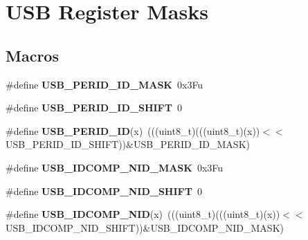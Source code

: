 \hypertarget{group___u_s_b___register___masks}{}\section{U\+SB Register Masks}
\label{group___u_s_b___register___masks}
\subsection*{Macros}
\begin{DoxyCompactItemize}
\item 
\mbox{\label{group___u_s_b___register___masks_ga7c4ef4c7ba738b9ec7ee90c6c482c1e5}} 
\#define {\bfseries U\+S\+B\+\_\+\+P\+E\+R\+I\+D\+\_\+\+I\+D\+\_\+\+M\+A\+SK}~0x3\+Fu
\item 
\mbox{\label{group___u_s_b___register___masks_ga15b2af97cadcb108b2489e2d29e8957e}} 
\#define {\bfseries U\+S\+B\+\_\+\+P\+E\+R\+I\+D\+\_\+\+I\+D\+\_\+\+S\+H\+I\+FT}~0
\item 
\mbox{\label{group___u_s_b___register___masks_gad306299b648ed1827f0b4a6ad1c81c1d}} 
\#define {\bfseries U\+S\+B\+\_\+\+P\+E\+R\+I\+D\+\_\+\+ID}(x)~(((uint8\+\_\+t)(((uint8\+\_\+t)(x))$<$$<$U\+S\+B\+\_\+\+P\+E\+R\+I\+D\+\_\+\+I\+D\+\_\+\+S\+H\+I\+FT))\&U\+S\+B\+\_\+\+P\+E\+R\+I\+D\+\_\+\+I\+D\+\_\+\+M\+A\+SK)
\item 
\mbox{\label{group___u_s_b___register___masks_ga91e5cef0c6203ea503c01ecb0f392819}} 
\#define {\bfseries U\+S\+B\+\_\+\+I\+D\+C\+O\+M\+P\+\_\+\+N\+I\+D\+\_\+\+M\+A\+SK}~0x3\+Fu
\item 
\mbox{\label{group___u_s_b___register___masks_gabb5fe5f72dcf289ba2d624ed18f8f07a}} 
\#define {\bfseries U\+S\+B\+\_\+\+I\+D\+C\+O\+M\+P\+\_\+\+N\+I\+D\+\_\+\+S\+H\+I\+FT}~0
\item 
\mbox{\label{group___u_s_b___register___masks_ga00f75febd050c5d7be60f755cc502eae}} 
\#define {\bfseries U\+S\+B\+\_\+\+I\+D\+C\+O\+M\+P\+\_\+\+N\+ID}(x)~(((uint8\+\_\+t)(((uint8\+\_\+t)(x))$<$$<$U\+S\+B\+\_\+\+I\+D\+C\+O\+M\+P\+\_\+\+N\+I\+D\+\_\+\+S\+H\+I\+FT))\&U\+S\+B\+\_\+\+I\+D\+C\+O\+M\+P\+\_\+\+N\+I\+D\+\_\+\+M\+A\+SK)

\end{DoxyCompactItemize}
